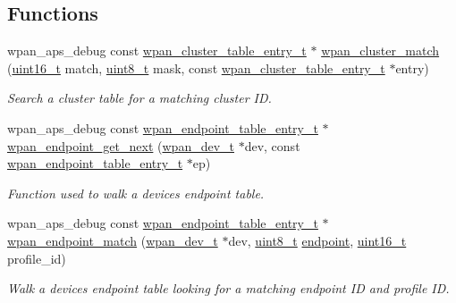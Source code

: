 \subsection*{Functions}
\begin{DoxyCompactItemize}
\item 
wpan\+\_\+aps\+\_\+debug const \hyperlink{structwpan__cluster__table__entry__t}{wpan\+\_\+cluster\+\_\+table\+\_\+entry\+\_\+t} $\ast$ \hyperlink{group__wpan__aps_ga1c725384b21faf5953683d7b028c7be3}{wpan\+\_\+cluster\+\_\+match} (\hyperlink{group__hal__dos_ga5a8b2dc9e45a9ee81a94ef304fb62505}{uint16\+\_\+t} match, \hyperlink{group__hal__dos_gae1affc9ca37cfb624959c866a73f83c2}{uint8\+\_\+t} mask, const \hyperlink{structwpan__cluster__table__entry__t}{wpan\+\_\+cluster\+\_\+table\+\_\+entry\+\_\+t} $\ast$entry)
\begin{DoxyCompactList}\small\item\em Search a cluster table for a matching cluster ID. \end{DoxyCompactList}\item 
wpan\+\_\+aps\+\_\+debug const \hyperlink{structwpan__endpoint__table__entry__t}{wpan\+\_\+endpoint\+\_\+table\+\_\+entry\+\_\+t} $\ast$ \hyperlink{group__wpan__aps_gaca3b72047ea4e156ce9a977c13624b5c}{wpan\+\_\+endpoint\+\_\+get\+\_\+next} (\hyperlink{structwpan__dev__t}{wpan\+\_\+dev\+\_\+t} $\ast$dev, const \hyperlink{structwpan__endpoint__table__entry__t}{wpan\+\_\+endpoint\+\_\+table\+\_\+entry\+\_\+t} $\ast$ep)
\begin{DoxyCompactList}\small\item\em Function used to walk a device\textquotesingle{}s endpoint table. \end{DoxyCompactList}\item 
wpan\+\_\+aps\+\_\+debug const \hyperlink{structwpan__endpoint__table__entry__t}{wpan\+\_\+endpoint\+\_\+table\+\_\+entry\+\_\+t} $\ast$ \hyperlink{group__wpan__aps_ga0a88c1b17d1f9a42a53668b14f15e205}{wpan\+\_\+endpoint\+\_\+match} (\hyperlink{structwpan__dev__t}{wpan\+\_\+dev\+\_\+t} $\ast$dev, \hyperlink{group__hal__dos_gae1affc9ca37cfb624959c866a73f83c2}{uint8\+\_\+t} \hyperlink{group__zdo_ga7d397493728da2bca8d55b2d61c4ec5d}{endpoint}, \hyperlink{group__hal__dos_ga5a8b2dc9e45a9ee81a94ef304fb62505}{uint16\+\_\+t} profile\+\_\+id)
\begin{DoxyCompactList}\small\item\em Walk a device\textquotesingle{}s endpoint table looking for a matching endpoint ID and profile ID. \end{DoxyCompactList}\item 

\end{DoxyCompactItemize}

